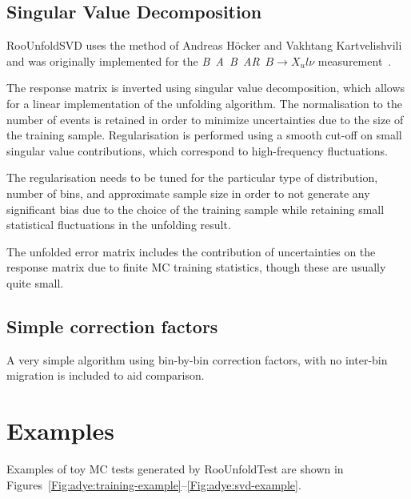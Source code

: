 \documentclass{desyproc}
\newcommand{\babar}{\mbox{\sl B\hspace{-0.4em} {\small\sl A}\hspace{-0.37em} \sl B\hspace{-0.4em} {\small\sl A\hspace{-0.02em}R}}}
\begin{document}
\subsection{Singular Value Decomposition}

RooUnfoldSVD uses the method of Andreas H\"ocker and Vakhtang Kartvelishvili~\cite{Hocker:1995kb}
and was originally implemented for the \babar\ $B \rightarrow X_ul\nu$ measurement~\cite{Tackmann:2008qa}.

The response matrix is inverted using singular value decomposition,
which allows for a linear implementation of the unfolding algorithm.
The normalisation to the number of events is retained in order to minimize
uncertainties due to the size of the training sample.
Regularisation is performed using a smooth cut-off on small singular value contributions,
which correspond to high-frequency fluctuations.

The regularisation needs to be tuned for the particular type of distribution, number of bins, and approximate sample size
in order to not generate any significant bias due to the choice of the training sample
while retaining small statistical fluctuations in the unfolding result.

The unfolded error matrix includes the contribution of uncertainties on the
response matrix due to finite MC training statistics, though these are usually quite small.

\subsection{Simple correction factors}

A very simple algorithm using bin-by-bin correction factors,
with no inter-bin migration is included to aid comparison.

\section{Examples\label{sec:adye:examples}}

Examples of toy MC tests generated by RooUnfoldTest are shown in Figures~\ref{Fig:adye:training-example}--\ref{Fig:adye:svd-example}.
\end{document}
